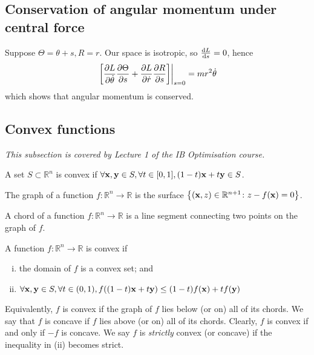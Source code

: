 \subsection{Conservation of angular momentum under central force}
\begin{example}
	Suppose \( \Theta = \theta + s, R = r \).
	Our space is isotropic, so \( \dv{L}{s} = 0 \), hence
	\[
		\eval{\qty[\pdv{L}{\dot\theta}\pdv{\Theta}{s} + \pdv{L}{\dot r}\pdv{R}{s}]}_{s=0} = mr^2\dot\theta
	\]
	which shows that angular momentum is conserved.
\end{example}

\subsection{Convex functions}
\textit{This subsection is covered by Lecture 1 of the IB Optimisation course.}
\begin{definition}
	A set \( S \subset \mathbb R^n \) is convex if \( \forall \vb x, \vb y \in S, \forall t \in [0,1], (1-t)\vb x + t \vb y \in S \).
\end{definition}
\begin{definition}
	The graph of a function \( f \colon \mathbb R^n \to \mathbb R \) is the surface \( \qty{ (\vb x, z)\in \mathbb R^{n+1} \colon z - f(\vb x) = 0} \).
\end{definition}
\begin{definition}
	A chord of a function \( f \colon \mathbb R^n \to \mathbb R \) is a line segment connecting two points on the graph of \( f \).
\end{definition}
\begin{definition}
	A function \( f \colon \mathbb R^n \to \mathbb R \) is convex if
	\begin{enumerate}[(i)]
		\item the domain of \( f \) is a convex set; and
		\item \( \forall \vb x, \vb y \in S, \forall t \in (0,1), f((1-t)\vb x + t\vb y) \leq (1-t)f(\vb x) + tf(\vb y) \)
	\end{enumerate}
	Equivalently, \( f \) is convex if the graph of \( f \) lies below (or on) all of its chords.
	We say that \( f \) is concave if \( f \) lies above (or on) all of its chords.
	Clearly, \( f \) is convex if and only if \( -f \) is concave.
	We say \( f \) is \textit{strictly} convex (or concave) if the inequality in (ii) becomes strict.
\end{definition}
